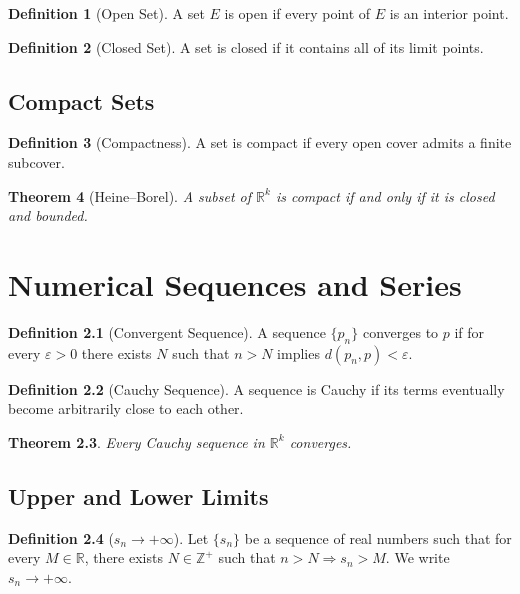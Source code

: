 \documentclass[11pt]{book}
\theoremstyle{definition}
\newtheorem{definition}{Definition}[chapter]
\theoremstyle{plain}
\newtheorem{theorem}[definition]{Theorem}
\newcommand{\R}{\mathbb{R}}
\newcommand{\Z}{\mathbb{Z}}
\begin{document}
\begin{definition}[Open Set]
A set $E$ is open if every point of $E$ is an interior point.
\end{definition}

\begin{definition}[Closed Set]
A set is closed if it contains all of its limit points.
\end{definition}

\section{Compact Sets}

\begin{definition}[Compactness]
A set is compact if every open cover admits a finite subcover.
\end{definition}

\begin{theorem}[Heine--Borel]
A subset of $\R^k$ is compact if and only if it is closed and bounded.
\end{theorem}

\chapter{Numerical Sequences and Series}

\begin{definition}[Convergent Sequence]
A sequence $\{p_n\}$ converges to $p$ if for every $\varepsilon>0$ there exists $N$ such that
$n>N$ implies $d(p_n,p)<\varepsilon$.
\end{definition}

\begin{definition}[Cauchy Sequence]
A sequence is Cauchy if its terms eventually become arbitrarily close to each other.
\end{definition}

\begin{theorem}
Every Cauchy sequence in $\R^k$ converges.
\end{theorem}

\section{Upper and Lower Limits}

\begin{definition}[$s_n \to +\infty$]
Let $\{s_n\}$ be a sequence of real numbers such that for every $M \in \R$, there exists
$N \in \Z^+$ such that $n > N \Rightarrow s_n > M$.
We write $s_n \to +\infty$.
\end{definition}
\end{document}
